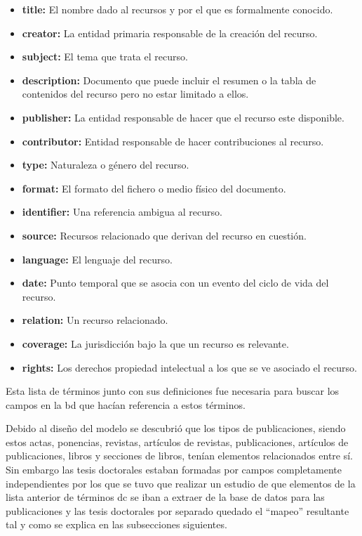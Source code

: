 \begin{itemize}
	\item \textbf{title:} El nombre dado al recursos y por el que es formalmente conocido.
	\item \textbf{creator:} La entidad primaria responsable de la creación del recurso.
	\item \textbf{subject:} El tema que trata el recurso.
	\item \textbf{description:} Documento que puede incluir el resumen o la tabla de contenidos del recurso pero no estar limitado a ellos.
	\item \textbf{publisher:} La entidad responsable de hacer que el recurso este disponible.
	\item \textbf{contributor:} Entidad responsable de hacer contribuciones al recurso.
	\item \textbf{type:} Naturaleza o género del recurso.
	\item \textbf{format:} El formato del fichero o medio físico del documento.
	\item \textbf{identifier:} Una referencia ambigua al recurso.
	\item \textbf{source:} Recursos relacionado que derivan del recurso en cuestión.
	\item \textbf{language:} El lenguaje del recurso.
	\item \textbf{date:} Punto temporal que se asocia con un evento del ciclo de vida del recurso.
	\item \textbf{relation:} Un recurso relacionado.
	\item \textbf{coverage:} La jurisdicción bajo la que un recurso es relevante.
	\item \textbf{rights:} Los derechos propiedad intelectual a los que se ve asociado el recurso.
\end{itemize}

Esta lista de términos junto con sus definiciones fue necesaria para buscar los campos en la \acrshort{bd} que hacían referencia a estos términos.

Debido al diseño del modelo se descubrió que los tipos de publicaciones, siendo estos actas, ponencias, revistas, artículos de revistas, publicaciones, artículos de publicaciones, libros y secciones de libros, tenían elementos relacionados entre sí. Sin embargo las tesis doctorales estaban formadas por campos completamente independientes por los que se tuvo que realizar un estudio de que elementos de la lista anterior de términos \acrshort{dc} se iban a extraer de la base de datos para las publicaciones y las tesis doctorales por separado quedado el ``mapeo'' resultante tal y como se explica en las subsecciones siguientes.

